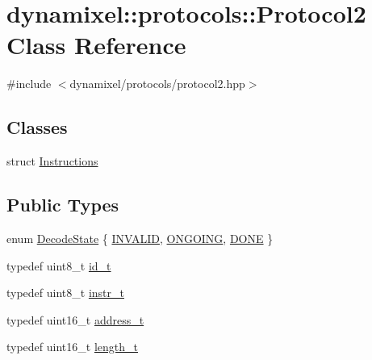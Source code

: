 \hypertarget{classdynamixel_1_1protocols_1_1_protocol2}{}\section{dynamixel\+:\+:protocols\+:\+:Protocol2 Class Reference}
\label{classdynamixel_1_1protocols_1_1_protocol2}


{\ttfamily \#include $<$dynamixel/protocols/protocol2.\+hpp$>$}

\subsection*{Classes}
\begin{DoxyCompactItemize}
\item 
struct \hyperlink{structdynamixel_1_1protocols_1_1_protocol2_1_1_instructions}{Instructions}
\end{DoxyCompactItemize}
\subsection*{Public Types}
\begin{DoxyCompactItemize}
\item 
enum \hyperlink{classdynamixel_1_1protocols_1_1_protocol2_ab779d109a8aeea8e2de436f6d23b43ed}{Decode\+State} \{ \hyperlink{classdynamixel_1_1protocols_1_1_protocol2_ab779d109a8aeea8e2de436f6d23b43eda569fcd58d8f9c65c5ee5b5bb1e418631}{I\+N\+V\+A\+L\+ID}, 
\hyperlink{classdynamixel_1_1protocols_1_1_protocol2_ab779d109a8aeea8e2de436f6d23b43edac1f7352bfa26dab3bbc18cd4931ad9f9}{O\+N\+G\+O\+I\+NG}, 
\hyperlink{classdynamixel_1_1protocols_1_1_protocol2_ab779d109a8aeea8e2de436f6d23b43eda4fdb93754f7b44f8fe28b5a8703bb605}{D\+O\+NE}
 \}
\item 
typedef uint8\+\_\+t \hyperlink{classdynamixel_1_1protocols_1_1_protocol2_a38d9cae72cd86213cca74e718c240429}{id\+\_\+t}
\item 
typedef uint8\+\_\+t \hyperlink{classdynamixel_1_1protocols_1_1_protocol2_aa7302f20356607bd51e4d4ecf4cb7abf}{instr\+\_\+t}
\item 
typedef uint16\+\_\+t \hyperlink{classdynamixel_1_1protocols_1_1_protocol2_ac5d0ba762aa1f860c0187d9e64982941}{address\+\_\+t}
\item 
typedef uint16\+\_\+t \hyperlink{classdynamixel_1_1protocols_1_1_protocol2_a962ea2a3d9aa7e6ca7cee3e0c38ce383}{length\+\_\+t}
\end{DoxyCompactItemize}
